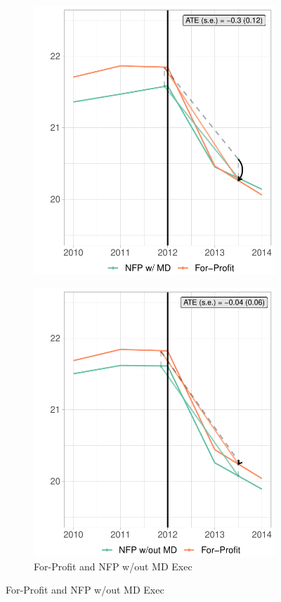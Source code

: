 \documentclass[12pt]{article}
\begin{document}
\begin{figure}
\begin{subfigure}[b]{0.45\textwidth}
         \includegraphics[width=\textwidth]{Objects/read_fp_md_synth_graph.pdf}
         \label{fig:read_synth_plotb}
     \end{subfigure}%
     \hfill
     \begin{subfigure}[b]{0.45\textwidth}
         \centering
         \caption{For-Profit and NFP w/out MD Exec}
         \includegraphics[width=\textwidth]{Objects/read_fp_nomd_synth_graph.pdf}

\end{subfigure}
\end{figure}
\end{document}
